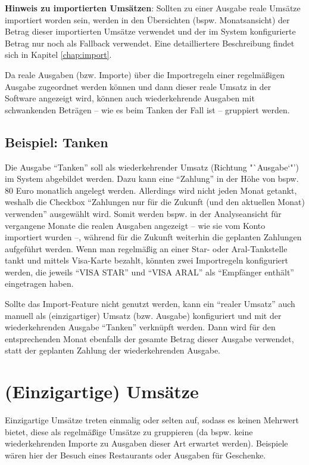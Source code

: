 \begin{infobox}
\textbf{Hinweis zu importierten Umsätzen}: Sollten zu einer Ausgabe reale Umsätze importiert worden sein, werden in den Übersichten (bspw. Monatsansicht) der Betrag dieser importierten Umsätze verwendet und der im System konfigurierte Betrag nur noch als Fallback verwendet. Eine detailliertere Beschreibung findet sich in Kapitel \ref{chap:import}. 
\end{infobox}

Da reale Ausgaben (bzw. Importe) über die Importregeln einer regelmäßigen Ausgabe zugeordnet werden können und dann dieser reale Umsatz in der Software angezeigt wird, können auch wiederkehrende Ausgaben mit schwankenden Beträgen -- wie es beim Tanken der Fall ist -- gruppiert werden.

\subsection*{Beispiel: Tanken}

Die Ausgabe "`Tanken"' soll als wiederkehrender Umsatz (Richtung "`Ausgabe`"') im System abgebildet werden. Dazu kann eine "`Zahlung"' in der Höhe von bspw. 80 Euro monatlich angelegt werden. Allerdings wird nicht jeden Monat getankt, weshalb die Checkbox "`Zahlungen nur für die Zukunft (und den aktuellen Monat) verwenden"' ausgewählt wird. Somit werden bspw. in der Analyseansicht für vergangene Monate die realen Ausgaben angezeigt -- wie sie vom Konto importiert wurden --, während für die Zukunft weiterhin die geplanten Zahlungen aufgeführt werden. Wenn man regelmäßig an einer Star- oder Aral-Tankstelle tankt und mittels Visa-Karte bezahlt, könnten zwei Importregeln konfiguriert werden, die jeweils  "`VISA STAR"' und "`VISA ARAL"' als "`Empfänger enthält"' eingetragen haben. 

Sollte das Import-Feature nicht genutzt werden, kann ein "`realer Umsatz"' auch manuell als (einzigartiger) Umsatz (bzw. Ausgabe) konfiguriert und mit der wiederkehrenden Ausgabe "`Tanken"' verknüpft werden. Dann wird für den entsprechenden Monat ebenfalls der gesamte Betrag dieser Ausgabe verwendet, statt der geplanten Zahlung der wiederkehrenden Ausgabe.


\section{(Einzigartige) Umsätze}

Einzigartige Umsätze treten einmalig oder selten auf, sodass es keinen Mehrwert bietet, diese als regelmäßige Umsätze zu gruppieren (da bspw. keine wiederkehrenden Importe zu Ausgaben dieser Art erwartet werden). Beispiele wären hier der Besuch eines Restaurants oder Ausgaben für Geschenke.

